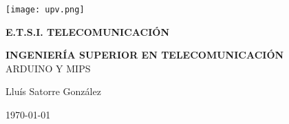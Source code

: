 

\begin{titlepage}

  \begin{center}

    \texttt{[image: upv.png]} \\
    
    \vspace{2.0cm}
    
    \LARGE{\textbf{E.T.S.I. TELECOMUNICACIÓN}} \\
    
    \vspace{1.0cm}
    
    \Large{\textbf{INGENIERÍA SUPERIOR EN TELECOMUNICACIÓN}} \\
    
    \vspace{3.0cm}
    \Large{ARDUINO Y MIPS} \\
    
    \vspace{2.0cm}
    
    \Large{Lluís Satorre González} \\
  
    \vspace{0.5cm}

    \large{\today}
    
  \end{center}
\end{titlepage}
